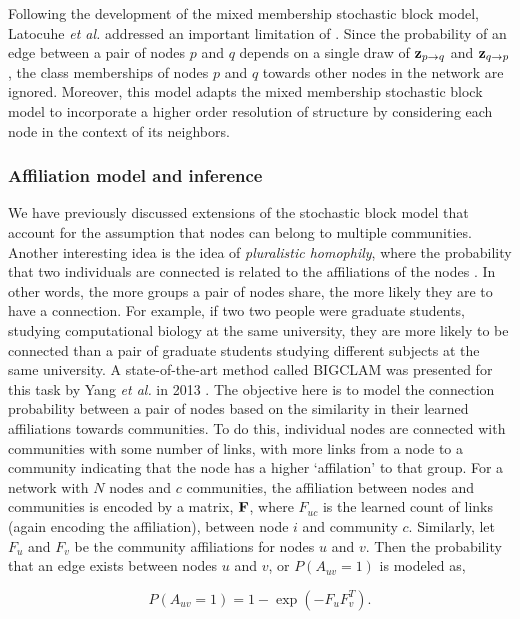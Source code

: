 Following the development of the mixed membership stochastic block model, Latocuhe \emph{et al.} \cite{LA} addressed an important limitation of \cite{mixMember}. Since the probability of an edge between a pair of nodes $p$ and $q$ depends on a single draw of ${\bf z}_{p\rightarrow q}$ and ${\bf z}_{q\rightarrow p}$, the class memberships of nodes $p$ and $q$ towards other nodes in the network are ignored. Moreover, this model adapts the mixed membership stochastic block model to incorporate a higher order resolution of structure by considering each node in the context of its neighbors. 

\subsubsection{Affiliation model and inference}

We have previously discussed extensions of the stochastic block model that account for the assumption that nodes can belong to multiple communities. Another interesting idea is the idea of \emph{pluralistic homophily}, where the probability that two individuals are connected is related to the affiliations of the nodes \cite{pluralHom}. In other words, the more groups a pair of nodes share, the more likely they are to have a connection. For example, if two two people were graduate students, studying computational biology at the same university, they are more likely to be connected than a pair of graduate students studying different subjects at the same university. A state-of-the-art method called BIGCLAM was presented for this task by Yang \emph{et al.} in 2013 \cite{bigclam}. The objective here is to model the connection probability between a pair of nodes based on the similarity in their learned affiliations towards communities. To do this, individual nodes are connected with communities with some number of links, with more links from a node to a community indicating that the node has a higher `affilation' to that group. For a network with $N$ nodes and $c$ communities, the affiliation between nodes and communities is encoded by a matrix, ${\bf F}$, where $F_{uc}$ is the learned count of links (again encoding the affiliation), between node $i$ and community $c$. Similarly, let $F_{u}$ and $F_{v}$ be the community affiliations for nodes $u$ and $v$. Then the probability that an edge exists between nodes $u$ and $v$, or $P(A_{uv}=1)$ is modeled as, 

\begin{equation}
P(A_{uv}=1)=1-\exp(-F_{u}F_{v}^{T}).
\label{eqAff}
\end{equation}

